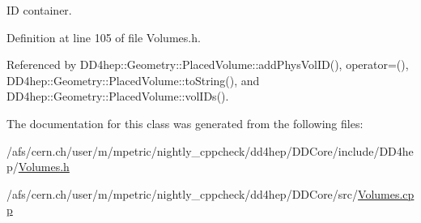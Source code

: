 ID container. 



Definition at line 105 of file Volumes.\+h.



Referenced by D\+D4hep\+::\+Geometry\+::\+Placed\+Volume\+::add\+Phys\+Vol\+I\+D(), operator=(), D\+D4hep\+::\+Geometry\+::\+Placed\+Volume\+::to\+String(), and D\+D4hep\+::\+Geometry\+::\+Placed\+Volume\+::vol\+I\+Ds().



The documentation for this class was generated from the following files\+:\begin{DoxyCompactItemize}
\item 
/afs/cern.\+ch/user/m/mpetric/nightly\+\_\+cppcheck/dd4hep/\+D\+D\+Core/include/\+D\+D4hep/\hyperlink{_volumes_8h}{Volumes.\+h}\item 
/afs/cern.\+ch/user/m/mpetric/nightly\+\_\+cppcheck/dd4hep/\+D\+D\+Core/src/\hyperlink{_volumes_8cpp}{Volumes.\+cpp}\end{DoxyCompactItemize}
